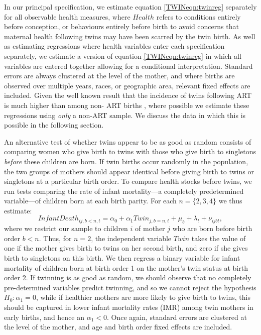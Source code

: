 \documentclass[subeqn]{article}
\begin{document}
\begin{spacing}{1.4}
In our principal specification, we estimate equation \ref{TWINeqn:twinreg}
separately for all observable health measures, where $Health$ refers to
conditions entirely before conception, or behaviours entirely before birth to
avoid concerns that maternal health following twins may have been scarred by the
twin birth.  As well as estimating regressions where health variables enter
each specification separately, we estimate a version of equation
\ref{TWINeqn:twinreg} in which all variables are entered together allowing for
a conditional interpretation.  Standard errors are always clustered at the
level of the mother, and where births are observed over multiple years, races,
or geographic area, relevant fixed effects are included.  Given the well known
result that the incidence of twins following ART is much higher than among non-%
ART births \citep{Vitthalaetal2009}, where possible we estimate these
regressions using \emph{only} a non-ART sample.  We discuss the data in which
this is possible in the following section.

An alternative test of whether twins appear to be as good as random consists of
comparing women who give birth to twins with those who give birth to singletons
\emph{before} these children are born.  If twin births occur randomly in the
population, the two groups of mothers should appear identical before giving
birth to twins or singletons at a particular birth order. To compare health
stocks before twins, we run tests comparing the rate of infant mortality---a
completely predetermined variable---of children born at each birth parity. For
each $n=\{2,3,4\}$ we thus estimate:
\begin{equation}
  \label{TWINeqn:twinIMR}
  InfantDeath_{ij,b<n,t}=\alpha_0 + \alpha_1 Twin_{j,b=n,t} + \mu_b + \lambda_t
                        +\nu_{ijbt},
\end{equation}
where we restrict our sample to children $i$ of mother $j$ who are born before
birth order $b<n$.  Thus, for $n=2$, the independent variable $Twin$ takes the
value of one if the mother gives birth to twins on her second birth, and zero if
she gives birth to singletons on this birth.  We then regress a binary variable
for infant mortality of children born at birth order 1 on the mother's twin
status at birth order 2. If twinning is as good as random, we should observe
that no completely pre-determined variables predict twinning, and so we cannot
reject the hypothesis $H_0: \alpha_1=0$, while if healthier mothers are more
likely to give birth to twins, this should be captured in lower infant mortality
rates (IMR) among twin mothers in early births, and hence an $\alpha_1<0$. Once
again, standard errors are clustered at the level of the mother, and age and
birth order fixed effects are included.



\end{spacing}
\end{document}
